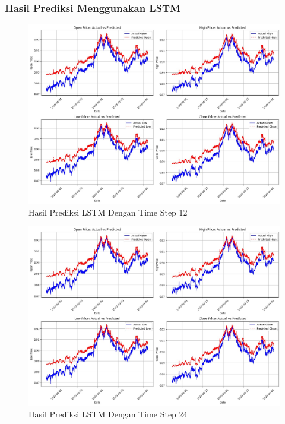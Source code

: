 \subsubsection{Hasil Prediksi Menggunakan LSTM}
\begin{figure} [H] \centering
    \includegraphics[scale=0.28]{gambar/hasillstm12.png} 
    \caption{Hasil Prediksi LSTM Dengan Time Step 12}
    \label{fig:label_gambar}
\end{figure}
\begin{figure} [H] \centering
    \includegraphics[scale=0.28]{gambar/hasillstm24.png} 
    \caption{Hasil Prediksi LSTM Dengan Time Step 24}
    \label{fig:label_gambar}
\end{figure}
